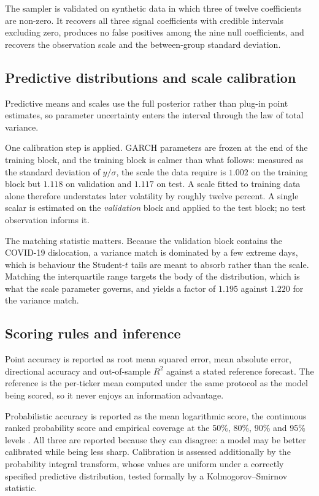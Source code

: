 The sampler is validated on synthetic data in which three of twelve coefficients
are non-zero. It recovers all three signal coefficients with credible intervals
excluding zero, produces no false positives among the nine null coefficients,
and recovers the observation scale and the between-group standard deviation.

\subsection{Predictive distributions and scale calibration}
\label{sec:calibration}

Predictive means and scales use the full posterior rather than plug-in point
estimates, so parameter uncertainty enters the interval through the law of total
variance.

One calibration step is applied. GARCH parameters are frozen at the end of the
training block, and the training block is calmer than what follows: measured as
the standard deviation of $y/\sigma$, the scale the data require is $1.002$ on
the training block but $1.118$ on validation and $1.117$ on test. A scale fitted
to training data alone therefore understates later volatility by roughly twelve
percent. A single scalar is estimated on the \emph{validation} block and applied
to the test block; no test observation informs it.

The matching statistic matters. Because the validation block contains the
COVID-19 dislocation, a variance match is dominated by a few extreme days, which
is behaviour the Student-$t$ tails are meant to absorb rather than the scale.
Matching the interquartile range targets the body of the distribution, which is
what the scale parameter governs, and yields a factor of $1.195$ against $1.220$
for the variance match.

\subsection{Scoring rules and inference}
\label{sec:scoring}

Point accuracy is reported as root mean squared error, mean absolute error,
directional accuracy and out-of-sample $R^2$ against a stated reference
forecast. The reference is the per-ticker mean computed under the same protocol
as the model being scored, so it never enjoys an information advantage.

Probabilistic accuracy is reported as the mean logarithmic score, the continuous
ranked probability score and empirical coverage at the 50\%, 80\%, 90\% and 95\%
levels \citep{gneiting2007strictly}. All three are reported because they can
disagree: a model may be better calibrated while being less sharp. Calibration
is assessed additionally by the probability integral transform, whose values are
uniform under a correctly specified predictive distribution, tested formally by
a Kolmogorov--Smirnov statistic.

